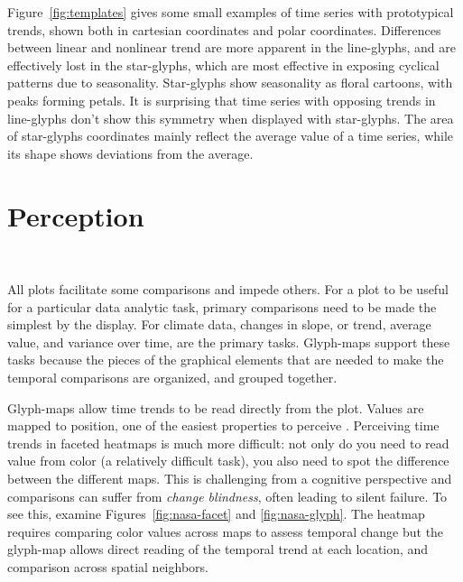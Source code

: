 \documentclass[oneside]{article}
\begin{document}
Figure~\ref{fig:templates} gives some small examples of time series with prototypical trends, shown both in cartesian coordinates and polar coordinates. Differences between linear and nonlinear trend are more apparent in the line-glyphs, and are effectively lost in the star-glyphs, which are most effective in exposing cyclical patterns due to seasonality. Star-glyphs show seasonality as floral cartoons, with peaks forming petals. It is surprising that time series with opposing trends in line-glyphs don't show this symmetry when displayed with star-glyphs. The area of star-glyphs coordinates mainly reflect the average value of a time series, while its shape shows deviations from the average.

\section{Perception}~\label{sec:perception}

All plots facilitate some comparisons and impede others. For a plot to be useful for a particular data analytic task, primary comparisons need to be made the simplest by the display. For climate data, changes in slope, or trend, average value, and variance over time, are the primary tasks. Glyph-maps support these tasks because the pieces of the graphical elements that are needed to make the temporal comparisons are organized, and grouped together.

Glyph-maps allow time trends to be read directly from the plot. Values are mapped to position, one of the easiest properties to perceive \citep{cleveland:1984}. Perceiving time trends in faceted heatmaps is much more difficult: not only do you need to read value from color (a relatively difficult task), you also need to spot the difference between the different maps. This is challenging from a cognitive perspective \citep{healey:2011,busey} and comparisons can suffer from \emph{change blindness}, often leading to silent failure. To see this, examine Figures~\ref{fig:nasa-facet} and \ref{fig:nasa-glyph}. The heatmap requires comparing color values across maps to assess temporal change but the glyph-map allows direct reading of the temporal trend at each location, and comparison across spatial neighbors.

\end{document}
